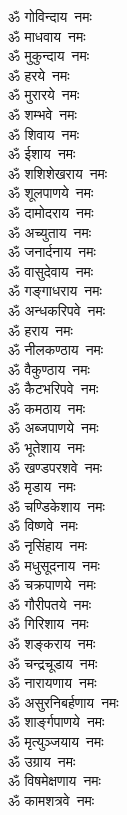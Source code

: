 \begin{multicols}{2}
\begin{flushleft}
ॐ गोविन्दाय~नमः\\
ॐ माधवाय~नमः\\
ॐ मुकुन्दाय~नमः\\
ॐ हरये~नमः\\
ॐ मुरारये~नमः\\
ॐ शम्भवे~नमः\\
ॐ शिवाय~नमः\\
ॐ ईशाय~नमः\\
ॐ शशिशेखराय~नमः\\
ॐ शूलपाणये~नमः\hfill{}\\
ॐ दामोदराय~नमः\\
ॐ अच्युताय~नमः\\
ॐ जनार्दनाय~नमः\\
ॐ वासुदेवाय~नमः\\
ॐ गङ्गाधराय~नमः\\
ॐ अन्धकरिपवे~नमः\\
ॐ हराय~नमः\\
ॐ नीलकण्ठाय~नमः\\
ॐ वैकुण्ठाय~नमः\\
ॐ कैटभरिपवे~नमः\hfill{}\\
ॐ कमठाय~नमः\\
ॐ अब्जपाणये~नमः\\
ॐ भूतेशाय~नमः\\
ॐ खण्डपरशवे~नमः\\
ॐ मृडाय~नमः\\
ॐ चण्डिकेशाय~नमः\\
ॐ विष्णवे~नमः\\
ॐ नृसिंहाय~नमः\\
ॐ मधुसूदनाय~नमः\\
ॐ चक्रपाणये~नमः\hfill{}\\
ॐ गौरीपतये~नमः\\
ॐ गिरिशाय~नमः\\
ॐ शङ्कराय~नमः\\
ॐ चन्द्रचूडाय~नमः\\
ॐ नारायणाय~नमः\\
ॐ असुरनिबर्हणाय~नमः\\
ॐ शार्ङ्गपाणये~नमः\\
ॐ मृत्युञ्जयाय~नमः\\
ॐ उग्राय~नमः\\
ॐ विषमेक्षणाय~नमः\hfill{}\\
ॐ कामशत्रवे~नमः\\

\end{flushleft}
\end{multicols}
